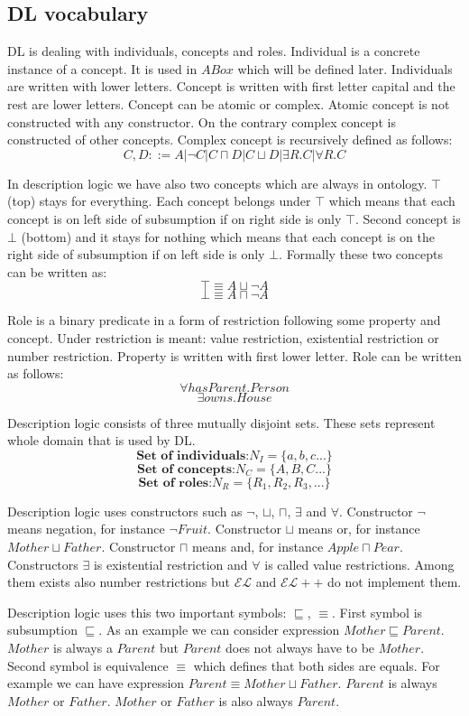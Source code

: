 \documentclass[12pt,a4paper]{article}
\begin{document}
\subsection{DL vocabulary}
DL is dealing with individuals, concepts and roles. Individual is a concrete instance of a concept. It is used in $ABox$ which will be defined later. Individuals are written with lower letters. Concept is written with first letter capital and the rest are lower letters. Concept can be atomic or complex. Atomic concept is not constructed with any constructor. On the contrary complex concept is constructed of other concepts. Complex concept is recursively defined as follows:
\[ C,D ::= A | \neg C | C \sqcap D | C \sqcup D | \exists R.C | \forall R.C  \]

In description logic we have also two concepts which are always in ontology. $\top$ (top) stays for everything. Each concept belongs under $\top$ which means that each concept is on left side of subsumption if on right side is only $\top$. Second concept is $\bot$ (bottom) and it stays for nothing which means that each concept is on the right side of subsumption if on left side is only $\bot$. Formally these two concepts can be written as:
\[ \top \equiv A \sqcup \neg A \]
\[ \bot \equiv A \sqcap \neg A \]

Role is a binary predicate in a form of restriction following some property and concept. Under restriction is meant: value restriction, existential restriction or number restriction. Property is written with first lower letter. Role can be written as follows: \[ \forall hasParent.Person \]
\[\exists owns.House \]	

Description logic consists of three mutually disjoint sets. These sets represent whole domain that is used by DL.
\[ \textbf{Set of individuals:} N_{I} = \{a,b,c...\} \]
\[ \textbf{Set of concepts:} N_{C} = \{A,B,C...\} \]
\[ \textbf{Set of roles:} N_{R} = \{R_{1},R_{2},R_{3},...\} \]

Description logic uses constructors such as $\neg$, $\sqcup$, $\sqcap$, $\exists$ and $\forall$. Constructor $\neg$ means negation, for instance $\neg Fruit$. Constructor $\sqcup$ means or, for instance $Mother \sqcup Father$. Constructor $\sqcap$ means and, for instance $Apple \sqcap Pear$. Constructors $\exists$ is existential restriction and $\forall$ is called value restrictions. Among them exists also number restrictions but $\mathcal{EL}$ and $\mathcal{EL}{+}{+}$ do not implement them.

Description logic uses this two important symbols: $\sqsubseteq$, $\equiv$. First symbol is subsumption $\sqsubseteq$. As an example we can consider expression $Mother \sqsubseteq Parent$. $Mother$ is always a $Parent$ but $Parent$ does not always have to be $Mother$. Second symbol is equivalence $\equiv$ which defines that both sides are equals. For example we can have expression $Parent \equiv Mother \sqcup Father$. $Parent$ is always $Mother$ or $Father$. $Mother$ or $Father$ is also always $Parent$.
\end{document}
